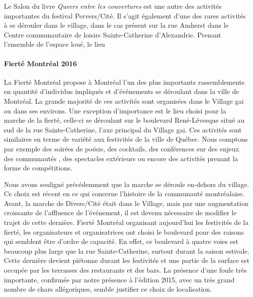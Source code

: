 Le Salon du livre \emph{Queers entre les couvertures} est une autre des activités importantes du festival Pervers/Cité.
Il s'agit également d'une des rares activités à se dérouler dans le village, dans le cas présent sur la rue Amherst dans le Centre communautaire de loisirs Sainte-Catherine d'Alexandrie.
Prenant l'ensemble de l'espace loué, le lieu

\paragraph{Fierté Montréal 2016}
\label{subsec:fiertemontreal2016}
La Fierté Montréal propose à Montréal l'un des plus importants rassemblements \lgbt en quantité d'individus impliqués et d'événements se déroulant dans la ville de Montréal.
La grande majorité de ces activités sont organisées dans le Village gai ou dans ses environs.
Une exception d'importance est le lieu choisi pour la marche de la fierté, celle-ci se déroulant sur le boulevard René-Lévesque situé au sud de la rue Sainte-Catherine, l'axe principal du Village gai.
Ces activités sont similaires en terme de variété aux festivités de la ville de Québec.
Nous comptons par exemple des soirées de poésie, des cocktails, des conférences sur des enjeux des communautés \lgbt, des spectacles extérieurs ou encore des activités prenant la forme de compétitions.


Nous avons souligné précédemment que la marche se déroule en-dehors du village.
Ce choix est récent en ce qui concerne l'histoire de la communauté \lgbt montréalaise.
Avant, la marche de Divers/Cité était dans le Village, mais par une augmentation croissante de l'affluence de l'événement, il est devenu nécessaire de modifier le trajet de cette dernière.
Fierté Montréal organisant aujourd'hui les festivités de la fierté, les organisateurs et organisatrices ont choisi le boulevard pour des raisons qui semblent être d'ordre de capacité.
En effet, ce boulevard à quatre voies est beaucoup plus large que la rue Sainte-Catherine, surtout durant la saison estivale.
Cette dernière devient piétonne durant les festivités et une partie de la surface est occupée par les terrasses des restaurants et des bars.
La présence d'une foule très importante, confirmée par notre présence à l'édition 2015, avec un très grand nombre de chars allégoriques, semble justifier ce choix de localisation.

